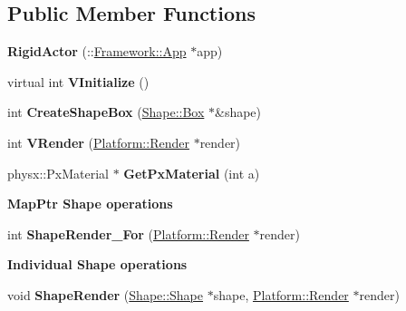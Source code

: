 \subsection*{Public Member Functions}
\begin{DoxyCompactItemize}
\item 
\hypertarget{classContent_1_1RigidActor_a5a47c6fbfef926e4ecd1d4007fa1c9d0}{
{\bfseries RigidActor} (::\hyperlink{classFramework_1_1App}{Framework::App} $\ast$app)}
\label{classContent_1_1RigidActor_a5a47c6fbfef926e4ecd1d4007fa1c9d0}

\item 
\hypertarget{classContent_1_1RigidActor_a0dba26c8c1a0a81382e20f996281d114}{
virtual int {\bfseries VInitialize} ()}
\label{classContent_1_1RigidActor_a0dba26c8c1a0a81382e20f996281d114}

\item 
\hypertarget{classContent_1_1RigidActor_ad937a0f32ea1f47bdbfda53dcc007ce0}{
int {\bfseries CreateShapeBox} (\hyperlink{classContent_1_1Shape_1_1Box}{Shape::Box} $\ast$\&shape)}
\label{classContent_1_1RigidActor_ad937a0f32ea1f47bdbfda53dcc007ce0}

\item 
\hypertarget{classContent_1_1RigidActor_a372f3f8bf780199c936a35fadb933210}{
int {\bfseries VRender} (\hyperlink{classPlatform_1_1Render}{Platform::Render} $\ast$render)}
\label{classContent_1_1RigidActor_a372f3f8bf780199c936a35fadb933210}

\item 
\hypertarget{classContent_1_1RigidActor_a8bf95f8a2f4e1cc6e9c716b25aad7202}{
physx::PxMaterial $\ast$ {\bfseries GetPxMaterial} (int a)}
\label{classContent_1_1RigidActor_a8bf95f8a2f4e1cc6e9c716b25aad7202}

\end{DoxyCompactItemize}
\begin{Indent}{\bf MapPtr Shape operations}\par
{\em \label{_amgrp726056380bdf0543f65a78c3b7b2b23d}
 }\begin{DoxyCompactItemize}
\item 
\hypertarget{classContent_1_1RigidActor_a1172670c7d48d23cb0f44f6412d3fc53}{
int {\bfseries ShapeRender\_\-For} (\hyperlink{classPlatform_1_1Render}{Platform::Render} $\ast$render)}
\label{classContent_1_1RigidActor_a1172670c7d48d23cb0f44f6412d3fc53}

\end{DoxyCompactItemize}
\end{Indent}
\begin{Indent}{\bf Individual Shape operations}\par
{\em \label{_amgrpc855414357a724b0a30bcc73b08d6b48}
 }\begin{DoxyCompactItemize}
\item 
\hypertarget{classContent_1_1RigidActor_a786a6e91abc26616dd566ea8376ccf93}{
void {\bfseries ShapeRender} (\hyperlink{classContent_1_1Shape_1_1Shape}{Shape::Shape} $\ast$shape, \hyperlink{classPlatform_1_1Render}{Platform::Render} $\ast$render)}
\label{classContent_1_1RigidActor_a786a6e91abc26616dd566ea8376ccf93}

\end{DoxyCompactItemize}
\end{Indent}
